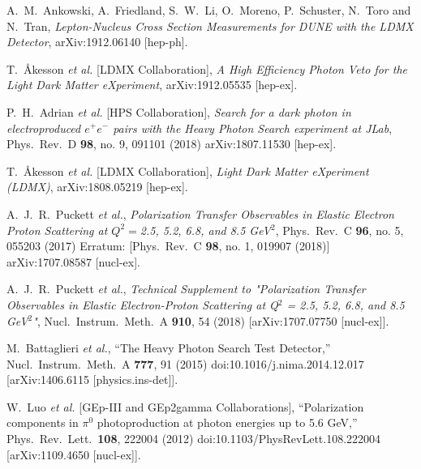 \documentclass[11pt]{article}
\begin{document}
    \begin{thebibliography}{99}

            A.~M.~Ankowski, A.~Friedland, S.~W.~Li, O.~Moreno, P.~Schuster, N.~Toro and N.~Tran,
            \emph{Lepton-Nucleus Cross Section Measurements for DUNE with the LDMX Detector},
            arXiv:1912.06140 [hep-ph].

            T.~Åkesson {\it et al.} [LDMX Collaboration],
            \emph{A High Efficiency Photon Veto for the Light Dark Matter eXperiment},
            arXiv:1912.05535 [hep-ex].

            P.~H.~Adrian {\it et al.} [HPS Collaboration],
            \emph{Search for a dark photon in electroproduced $e^{+}e^{-}$ pairs with the Heavy Photon Search experiment at JLab},
            Phys.\ Rev.\ D {\bf 98}, no. 9, 091101 (2018)
            arXiv:1807.11530 [hep-ex].
        
            T.~Åkesson {\it et al.} [LDMX Collaboration],
            \emph{Light Dark Matter eXperiment (LDMX)},
            arXiv:1808.05219 [hep-ex].

            A.~J.~R.~Puckett {\it et al.},
            \emph{Polarization Transfer Observables in Elastic Electron Proton Scattering at $Q^2 = $2.5, 5.2, 6.8, and 8.5 GeV$^2$},
            Phys.\ Rev.\ C {\bf 96}, no. 5, 055203 (2017)
            Erratum: [Phys.\ Rev.\ C {\bf 98}, no. 1, 019907 (2018)]
            arXiv:1707.08587 [nucl-ex].

            A.~J.~R.~Puckett {\it et al.},
            \emph{Technical Supplement to "Polarization Transfer Observables in Elastic Electron-Proton Scattering at Q$^2$ = 2.5, 5.2, 6.8, and 8.5 GeV$^2$"},
            Nucl.\ Instrum.\ Meth.\ A {\bf 910}, 54 (2018)
            [arXiv:1707.07750 [nucl-ex]].

            M.~Battaglieri {\it et al.},
            ``The Heavy Photon Search Test Detector,''
            Nucl.\ Instrum.\ Meth.\ A {\bf 777}, 91 (2015)
            doi:10.1016/j.nima.2014.12.017
            [arXiv:1406.6115 [physics.ins-det]].

            W.~Luo {\it et al.} [GEp-III and GEp2gamma Collaborations],
            ``Polarization components in $\pi^{0}$ photoproduction at photon energies up to 5.6 GeV,''
            Phys.\ Rev.\ Lett.\  {\bf 108}, 222004 (2012)
            doi:10.1103/PhysRevLett.108.222004
            [arXiv:1109.4650 [nucl-ex]].


\end{thebibliography}
\end{document}
